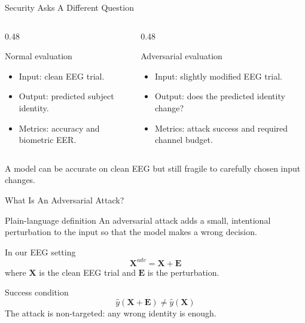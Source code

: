 \documentclass[aspectratio=169,11pt]{beamer}
\newcommand{\smallgap}{\vspace{0.45em}}
\begin{document}
\begin{frame}{Security Asks A Different Question}
\begin{columns}[T,onlytextwidth]
  \begin{column}{0.48\textwidth}
    \begin{block}{Normal evaluation}
      \begin{itemize}
        \item Input: clean EEG trial.
        \item Output: predicted subject identity.
        \item Metrics: accuracy and biometric EER.
      \end{itemize}
    \end{block}
  \end{column}
  \begin{column}{0.48\textwidth}
    \begin{block}{Adversarial evaluation}
      \begin{itemize}
        \item Input: slightly modified EEG trial.
        \item Output: does the predicted identity change?
        \item Metrics: attack success and required channel budget.
      \end{itemize}
    \end{block}
  \end{column}
\end{columns}

\smallgap
\begin{center}
\alert{A model can be accurate on clean EEG but still fragile to carefully chosen input changes.}
\end{center}
\end{frame}

\begin{frame}{What Is An Adversarial Attack?}
\begin{block}{Plain-language definition}
An adversarial attack adds a small, intentional perturbation to the input so that the model makes a wrong decision.
\end{block}

\begin{block}{In our EEG setting}
\[
\mathbf{X}^{adv}=\mathbf{X}+\mathbf{E}
\]
where \(\mathbf{X}\) is the clean EEG trial and \(\mathbf{E}\) is the perturbation.
\end{block}

\begin{block}{Success condition}
\[
\hat{y}(\mathbf{X}+\mathbf{E})\neq \hat{y}(\mathbf{X})
\]
The attack is non-targeted: any wrong identity is enough.
\end{block}
\end{frame}
\end{document}
